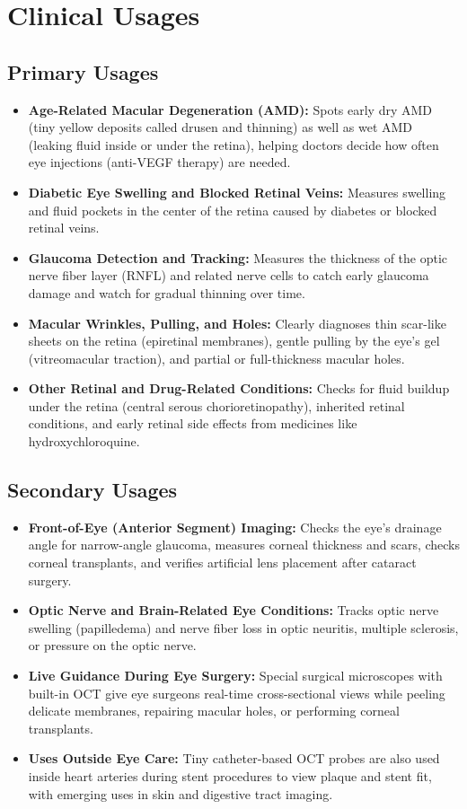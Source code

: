\section{Clinical Usages}

\subsection{Primary Usages}
\begin{itemize}
\item \textbf{Age-Related Macular Degeneration (AMD):} Spots early dry AMD (tiny yellow deposits called drusen and thinning) as well as wet AMD (leaking fluid inside or under the retina), helping doctors decide how often eye injections (anti-VEGF therapy) are needed.
\item \textbf{Diabetic Eye Swelling and Blocked Retinal Veins:} Measures swelling and fluid pockets in the center of the retina caused by diabetes or blocked retinal veins.
\item \textbf{Glaucoma Detection and Tracking:} Measures the thickness of the optic nerve fiber layer (RNFL) and related nerve cells to catch early glaucoma damage and watch for gradual thinning over time.
\item \textbf{Macular Wrinkles, Pulling, and Holes:} Clearly diagnoses thin scar-like sheets on the retina (epiretinal membranes), gentle pulling by the eye's gel (vitreomacular traction), and partial or full-thickness macular holes.
\item \textbf{Other Retinal and Drug-Related Conditions:} Checks for fluid buildup under the retina (central serous chorioretinopathy), inherited retinal conditions, and early retinal side effects from medicines like hydroxychloroquine.
\end{itemize}

\subsection{Secondary Usages}
\begin{itemize}
\item \textbf{Front-of-Eye (Anterior Segment) Imaging:} Checks the eye's drainage angle for narrow-angle glaucoma, measures corneal thickness and scars, checks corneal transplants, and verifies artificial lens placement after cataract surgery.
\item \textbf{Optic Nerve and Brain-Related Eye Conditions:} Tracks optic nerve swelling (papilledema) and nerve fiber loss in optic neuritis, multiple sclerosis, or pressure on the optic nerve.
\item \textbf{Live Guidance During Eye Surgery:} Special surgical microscopes with built-in OCT give eye surgeons real-time cross-sectional views while peeling delicate membranes, repairing macular holes, or performing corneal transplants.
\item \textbf{Uses Outside Eye Care:} Tiny catheter-based OCT probes are also used inside heart arteries during stent procedures to view plaque and stent fit, with emerging uses in skin and digestive tract imaging.
\end{itemize}


